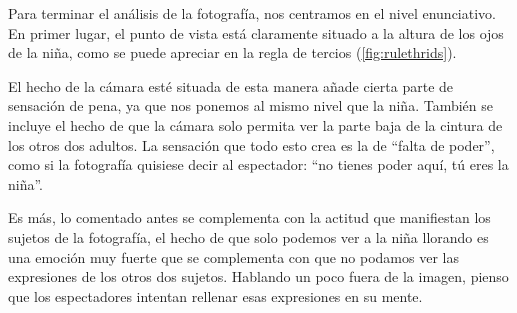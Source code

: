\documentclass[11pt]{article}
\begin{document}
Para terminar el análisis de la fotografía, nos centramos en el nivel enunciativo.
En primer lugar, el punto de vista está claramente situado a la altura de los ojos de la niña, como se puede apreciar en la regla de tercios (\ref{fig:rulethrids}).\newline

El hecho de la cámara esté situada de esta manera añade cierta parte de sensación de pena, ya que nos ponemos al mismo nivel que la niña.
También se incluye el hecho de que la cámara solo permita ver la parte baja de la cintura de los otros dos adultos. La sensación que todo esto crea es la de “falta de poder”, como si la fotografía quisiese decir al espectador: “no tienes poder aquí, tú eres la niña”. \newline

Es más, lo comentado antes se complementa con la actitud que manifiestan los sujetos de la fotografía, el hecho de que solo podemos ver a la niña llorando es una emoción muy fuerte que se complementa con que no podamos ver las expresiones de los otros dos sujetos. Hablando un poco fuera de la imagen, pienso que los espectadores intentan rellenar esas expresiones en su mente. \newline

\newpage

\printbibliography
\newpage

\blinddocument
\end{document}
